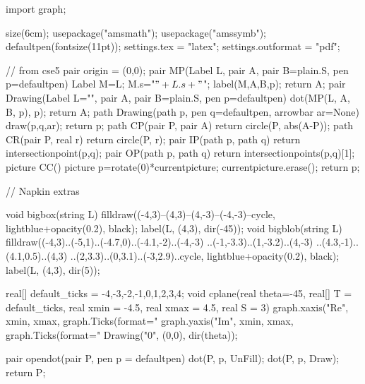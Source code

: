 \usepackage{patch-asy}
\renewcommand{\theasy}{\thechapter\Alph{asy}}
\begin{asydef}
	import graph;

	size(6cm);
	usepackage("amsmath");
	usepackage("amssymb");
	defaultpen(fontsize(11pt));
	settings.tex = "latex";
	settings.outformat = "pdf";

	// from cse5
	pair origin = (0,0);
	pair MP(Label L, pair A, pair B=plain.S, pen p=defaultpen) {
		Label M=L;
		M.s="\("+L.s+"\)";
		label(M,A,B,p);
		return A;
	}
	pair Drawing(Label L="", pair A, pair B=plain.S, pen p=defaultpen) {
		dot(MP(L, A, B, p), p);
		return A;
	}
	path Drawing(path p, pen q=defaultpen, arrowbar ar=None) {
		draw(p,q,ar);
		return p;
	}
	path CP(pair P, pair A) { return circle(P, abs(A-P)); }
	path CR(pair P, real r) { return circle(P, r); }
	pair IP(path p, path q) { return intersectionpoint(p,q); }
	pair OP(path p, path q) { return intersectionpoints(p,q)[1]; }
	picture CC() {
		picture p=rotate(0)*currentpicture;
		currentpicture.erase();
		return p;
	}

	// Napkin extras

	void bigbox(string L) {
		filldraw((-4,3)--(4,3)--(4,-3)--(-4,-3)--cycle,
			lightblue+opacity(0.2), black);
		label(L, (4,3), dir(-45));
	}
	void bigblob(string L) {
		filldraw((-4,3)..(-5,1)..(-4.7,0)..(-4.1,-2)..(-4,-3)
			..(-1,-3.3)..(1,-3.2)..(4,-3)
			..(4.3,-1)..(4.1,0.5)..(4,3)
			..(2,3.3)..(0,3.1)..(-3,2.9)..cycle,
			lightblue+opacity(0.2), black);
		label(L, (4,3), dir(5));
	}

	real[] default_ticks = {-4,-3,-2,-1,0,1,2,3,4};
	void cplane(real theta=-45, real[] T = default_ticks, real xmin = -4.5, real xmax = 4.5, real S = 3) {
		graph.xaxis("Re", xmin, xmax, graph.Ticks(format="%
		graph.yaxis("Im", xmin, xmax, graph.Ticks(format="%
		Drawing("0", (0,0), dir(theta));
	}

	pair opendot(pair P, pen p = defaultpen) {
		dot(P, p, UnFill);
		dot(P, p, Draw);
		return P;
	}
\end{asydef}
\def\asydir{asy}

